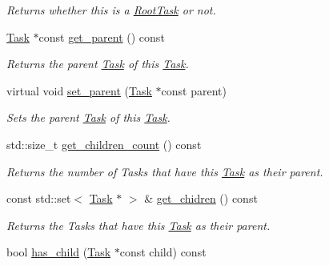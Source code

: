 \begin{DoxyCompactItemize}
\begin{DoxyCompactList}\small\item\em Returns whether this is a \hyperlink{classsigma_1_1core_1_1tasks_1_1_root_task}{Root\+Task} or not. \end{DoxyCompactList}\item 
\hyperlink{classsigma_1_1core_1_1tasks_1_1_task}{Task} $\ast$const \hyperlink{classsigma_1_1core_1_1tasks_1_1_task_a6949e9ea07ce3738f29c39b25acb9f26}{get\+\_\+parent} () const 
\begin{DoxyCompactList}\small\item\em Returns the parent \hyperlink{classsigma_1_1core_1_1tasks_1_1_task}{Task} of this \hyperlink{classsigma_1_1core_1_1tasks_1_1_task}{Task}. \end{DoxyCompactList}\item 
virtual void \hyperlink{classsigma_1_1core_1_1tasks_1_1_task_a975655055e70f4a2228153e84ff4e725}{set\+\_\+parent} (\hyperlink{classsigma_1_1core_1_1tasks_1_1_task}{Task} $\ast$const parent)
\begin{DoxyCompactList}\small\item\em Sets the parent \hyperlink{classsigma_1_1core_1_1tasks_1_1_task}{Task} of this \hyperlink{classsigma_1_1core_1_1tasks_1_1_task}{Task}. \end{DoxyCompactList}\item 
\hypertarget{classsigma_1_1core_1_1tasks_1_1_task_a75a3b0784751a8e82b56593407ba8858}{}std\+::size\+\_\+t \hyperlink{classsigma_1_1core_1_1tasks_1_1_task_a75a3b0784751a8e82b56593407ba8858}{get\+\_\+children\+\_\+count} () const \label{classsigma_1_1core_1_1tasks_1_1_task_a75a3b0784751a8e82b56593407ba8858}

\begin{DoxyCompactList}\small\item\em Returns the number of Tasks that have this \hyperlink{classsigma_1_1core_1_1tasks_1_1_task}{Task} as their parent. \end{DoxyCompactList}\item 
\hypertarget{classsigma_1_1core_1_1tasks_1_1_task_adf1f29e8c9be557865e80d79e8ffb33f}{}const std\+::set$<$ \hyperlink{classsigma_1_1core_1_1tasks_1_1_task}{Task} $\ast$ $>$ \& \hyperlink{classsigma_1_1core_1_1tasks_1_1_task_adf1f29e8c9be557865e80d79e8ffb33f}{get\+\_\+chidren} () const \label{classsigma_1_1core_1_1tasks_1_1_task_adf1f29e8c9be557865e80d79e8ffb33f}

\begin{DoxyCompactList}\small\item\em Returns the Tasks that have this \hyperlink{classsigma_1_1core_1_1tasks_1_1_task}{Task} as their parent. \end{DoxyCompactList}\item 
\hypertarget{classsigma_1_1core_1_1tasks_1_1_task_a99e98800a473e1a05093d64853b75740}{}bool \hyperlink{classsigma_1_1core_1_1tasks_1_1_task_a99e98800a473e1a05093d64853b75740}{has\+\_\+child} (\hyperlink{classsigma_1_1core_1_1tasks_1_1_task}{Task} $\ast$const child) const \label{classsigma_1_1core_1_1tasks_1_1_task_a99e98800a473e1a05093d64853b75740}


\end{DoxyCompactItemize}
